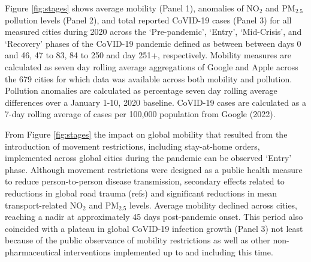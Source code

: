 \documentclass[preprint,12pt]{elsarticle}
\begin{document}
Figure \ref{fig:stages} shows average mobility (Panel 1), anomalies of NO$_{2}$ and PM$_{2.5}$ pollution levels (Panel 2), and total reported CoVID-19 cases (Panel 3) for all measured cities during 2020 across the `Pre-pandemic', `Entry', `Mid-Crisis', and `Recovery' phases of the CoVID-19 pandemic defined as between between days 0 and 46, 47 to 83, 84 to 250 and day 251+, respectively. Mobility measures are calculated as seven day rolling average aggregations of Google and Apple across the 679 cities for which data was available across both mobility and pollution. Pollution anomalies are calculated as percentage seven day rolling average differences over a January 1-10, 2020 baseline. CoVID-19 cases are calculated as a 7-day rolling average of cases per 100,000 population from Google (2022)\cite{Google2022}.

From Figure \ref{fig:stages} the impact on global mobility that resulted from the introduction of movement restrictions, including stay-at-home orders, implemented across global cities during the pandemic can be observed `Entry' phase\cite{hale2021global}. Although movement restrictions were designed as a public health measure to reduce person-to-person disease transmission, secondary effects related to reductions in global road trauma (refs) and significant reductions in mean transport-related NO$_{2}$ and PM$_{2.5}$ levels\cite{zhang2023impact}. Average mobility declined across cities, reaching a nadir at approximately 45 days post-pandemic onset. This period also coincided with a plateau in global CoVID-19 infection growth (Panel 3) not least because of the public observance of mobility restrictions as well as other non-pharmaceutical interventions implemented up to and including this time\cite{hale2021global}. 
\end{document}
